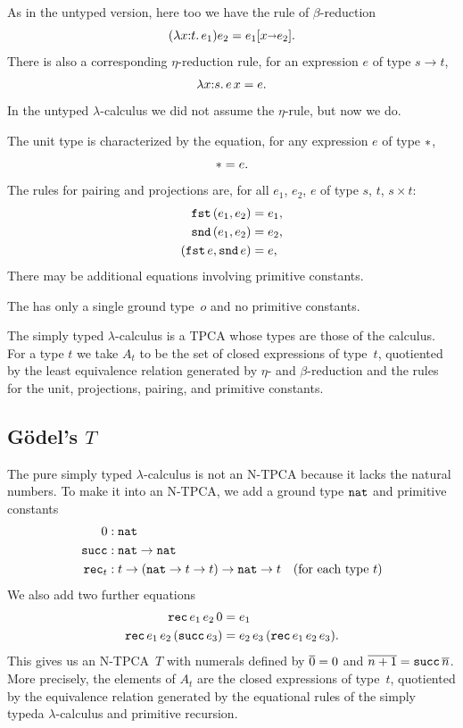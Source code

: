 As in the untyped version, here too we have the rule of
$\beta$-reduction
%
\begin{equation*}
  (\lambda x {:} t .\,e_1) e_2 = e_1[x {\shortrightarrow} e_2].
\end{equation*}
%
There is also a corresponding $\eta$-reduction rule, for an expression
$e$ of type $s \to t$,
%
\begin{equation*}
  \lambda x {:} s .\,e\,x = e.
\end{equation*}
%
In the untyped $\lambda$-calculus we did not assume the $\eta$-rule,
but now we do.

The unit type is characterized by the equation, for any expression $e$
of type ${*}$,
%
\begin{equation*}
  {*} = e.
\end{equation*}
%
The rules for pairing and projections are, for all $e_1$, $e_2$, $e$
of type $s$, $t$, $s \times t$:
%
\begin{align*}
  \mathtt{fst}\,(e_1, e_2) &= e_1,
  \\
  \mathtt{snd}\,(e_1, e_2) &= e_2,
  \\
  (\mathtt{fst}\,e, \mathtt{snd}\,e) &= e,
\end{align*}
%
There may be additional equations involving primitive constants.

The  has only a single ground
type~$o$ and no primitive constants.

The simply typed $\lambda$-calculus is a TPCA whose types are those of the
calculus. For a type $t$ we take $A_t$ to be the set of closed
expressions of type~$t$, quotiented by the least equivalence relation
generated by $\eta$- and $\beta$-reduction and the rules for the unit,
projections, pairing, and primitive constants.

\subsection[\texorpdfstring{Gödel's $T$}{Gödel's T}]{Gödel's $T$}

The pure simply typed $\lambda$-calculus is not an N-TPCA because it lacks the
natural numbers. To make it into an N-TPCA, we
add a ground type $\mathtt{nat}$ and primitive constants
%
\begin{align*}
  0 &: \mathtt{nat} \\
  \mathtt{succ}  &: \mathtt{nat} \to \mathtt{nat} \\
  \mathtt{rec}_t &: t \to (\mathtt{nat} \to t \to t) \to \mathtt{nat} \to t
  \quad\text{(for each type $t$)}
\end{align*}
%
We also add two further equations
%
\begin{align*}
  \mathtt{rec} \, e_1 \, e_2 \, 0 &= e_1
  \\
  \mathtt{rec} \, e_1 \, e_2 \, (\mathtt{succ} \, e_3) &=
  e_2 \, e_3 \, (\mathtt{rec} \, e_1 \, e_2 \, e_3).
\end{align*}
%
This gives us an N-TPCA~$T$ with numerals defined by $\overline{0} = 0$
and $\overline{n+1} = \mathtt{succ} \, \overline{n}$. More precisely, the
elements of $A_t$ are the closed expressions of type~$t$, quotiented by
the equivalence relation generated by the equational rules of the simply typeda
$\lambda$-calculus and primitive recursion.

